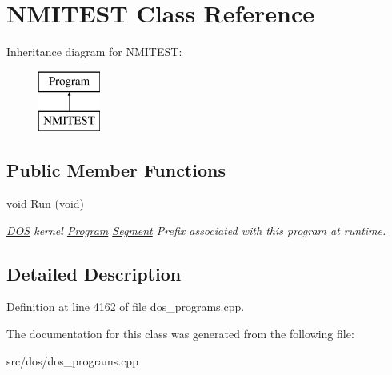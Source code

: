 \hypertarget{classNMITEST}{\section{N\-M\-I\-T\-E\-S\-T Class Reference}
\label{classNMITEST}
}
Inheritance diagram for N\-M\-I\-T\-E\-S\-T\-:\begin{figure}[H]
\begin{center}
\leavevmode
\includegraphics[height=2.000000cm]{classNMITEST}
\end{center}
\end{figure}
\subsection*{Public Member Functions}
\begin{DoxyCompactItemize}
\item 
\hypertarget{classNMITEST_a5ce5aded9d44d5eacd3c640455207076}{void \hyperlink{classNMITEST_a5ce5aded9d44d5eacd3c640455207076}{Run} (void)}\label{classNMITEST_a5ce5aded9d44d5eacd3c640455207076}

\begin{DoxyCompactList}\small\item\em \hyperlink{classDOS}{D\-O\-S} kernel \hyperlink{classProgram}{Program} \hyperlink{structSegment}{Segment} Prefix associated with this program at runtime. \end{DoxyCompactList}\end{DoxyCompactItemize}


\subsection{Detailed Description}


Definition at line 4162 of file dos\-\_\-programs.\-cpp.



The documentation for this class was generated from the following file\-:\begin{DoxyCompactItemize}
\item 
src/dos/dos\-\_\-programs.\-cpp\end{DoxyCompactItemize}
